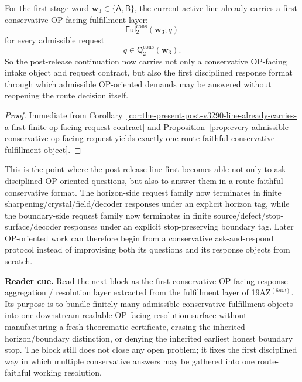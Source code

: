 \begin{corollary}
\label{cor:the-present-post-v3290-line-already-carries-a-first-op-facing-fulfillment-layer}
For the first-stage word \(\mathbf w_3\in\{\mathsf A,\mathsf B\}\), the current active line already carries a first conservative OP-facing fulfillment layer:
\[
 \mathsf{Ful}^{\mathrm{cons}}_{2}(\mathbf w_3;q)
\]
for every admissible request
\[
 q\in\mathsf{Q}^{\mathrm{cons}}_{2}(\mathbf w_3).
\]
So the post-release continuation now carries not only a conservative OP-facing intake object and request contract, but also the first disciplined response format through which admissible OP-oriented demands may be answered without reopening the route decision itself.
\end{corollary}

\begin{proof}
Immediate from Corollary~\ref{cor:the-present-post-v3290-line-already-carries-a-first-finite-op-facing-request-contract} and Proposition~\ref{prop:every-admissible-conservative-op-facing-request-yields-exactly-one-route-faithful-conservative-fulfillment-object}.
\end{proof}

\begin{remark}
\label{rem:what-the-first-conservative-op-facing-response-fulfillment-layer-now-buys}
This is the point where the post-release line first becomes able not only to ask disciplined OP-oriented questions, but also to answer them in a route-faithful conservative format. The horizon-side request family now terminates in finite sharpening/crystal/field/decoder responses under an explicit horizon tag, while the boundary-side request family now terminates in finite source/defect/stop-surface/decoder responses under an explicit stop-preserving boundary tag. Later OP-oriented work can therefore begin from a conservative ask-and-respond protocol instead of improvising both its questions and its response objects from scratch.
\end{remark}



\noindent\textbf{Reader cue.} Read the next block as the first conservative OP-facing response aggregation / resolution layer extracted from the fulfillment layer of 19AZ$^{(6aw)}$. Its purpose is to bundle finitely many admissible conservative fulfillment objects into one downstream-readable OP-facing resolution surface without manufacturing a fresh theorematic certificate, erasing the inherited horizon/boundary distinction, or denying the inherited earliest honest boundary stop. The block still does not close any open problem; it fixes the first disciplined way in which multiple conservative answers may be gathered into one route-faithful working resolution.

